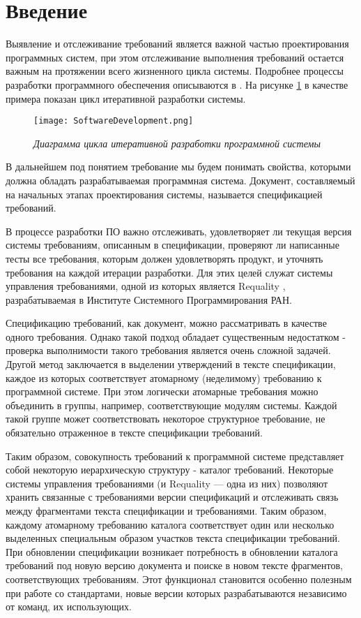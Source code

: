 \section{Введение}
\label{sec:Chapter1} 
Выявление и отслеживание требований является важной частью проектирования программных систем, при этом отслеживание выполнения требований остается важным на протяжении всего жизненного цикла системы. Подробнее процессы разработки программного обеспечения описываются в \cite{web:DevelopmentProcesses}. На рисунке \ref{intro:image1} в качестве примера показан цикл итеративной разработки системы.

\begin{figure}[h]
\begin{center}
\texttt{[image: SoftwareDevelopment.png]}
\caption{\emph{Диаграмма цикла итеративной разработки программной системы}}
\label{intro:image1}
\end{center}
\end{figure}

В дальнейшем под понятием требование мы будем понимать свойства, которыми должна обладать разрабатываемая программная система.\cite{book:Requirements} \cite{book:SWEBOK} Документ, составляемый на начальных этапах проектирования системы, называется спецификацией требований.

В процессе разработки ПО важно отслеживать, удовлетворяет ли текущая версия системы требованиям, описанным в спецификации, проверяют ли написанные тесты все требования, которым должен удовлетворять продукт, и уточнять требования на каждой итерации разработки. Для этих целей служат системы управления требованиями, одной из которых является Requality \cite{web:Requality}, разрабатываемая в Институте Системного Программирования РАН.

Спецификацию требований, как документ, можно рассматривать в качестве одного требования. Однако такой подход обладает существенным недостатком - проверка выполнимости такого требования является очень сложной задачей. Другой метод заключается в выделении утверждений в тексте спецификации, каждое из которых соответствует атомарному (неделимому) требованию к программной системе. При этом логически атомарные требования можно объединить в группы, например, соответствующие модулям системы. Каждой такой группе может соответствовать некоторое структурное требование, не обязательно отраженное в тексте спецификации требований.

Таким образом, совокупность требований к программной системе представляет собой некоторую иерархическую структуру - каталог требований. Некоторые системы управления требованиями (и Requality --- одна из них) позволяют хранить связанные с требованиями версии спецификаций и отслеживать связь между фрагментами текста спецификации и требованиями. Таким образом, каждому атомарному требованию каталога соответствует один или несколько выделенных специальным образом участков текста спецификации требований. При обновлении спецификации возникает потребность в обновлении каталога требований под новую версию документа и поиске в новом тексте фрагментов, соответствующих требованиям. Этот функционал становится особенно полезным при работе со стандартами, новые версии которых разрабатываются независимо от команд, их использующих.

